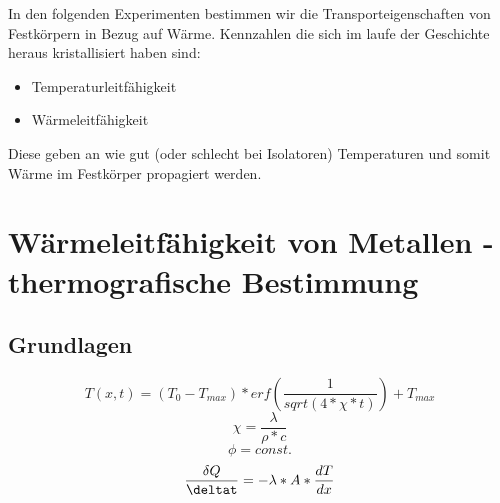\documentclass[12pt,a4paper]{article}
\begin{document}
\begin{multicols}{2}




%			


\noindent In den folgenden Experimenten bestimmen wir die Transporteigenschaften von Festkörpern in Bezug auf Wärme. Kennzahlen die sich im laufe der Geschichte heraus kristallisiert haben sind:\\
\begin{itemize}
	\item Temperaturleitfähigkeit
	\item Wärmeleitfähigkeit
\end{itemize}
Diese geben an wie gut (oder schlecht bei Isolatoren) Temperaturen und somit Wärme im Festkörper propagiert werden.

\section{Wärmeleitfähigkeit von Metallen - thermografische Bestimmung}

\subsection{Grundlagen}
$$T(x,t) = (T_0 - T_{max}) * erf(\frac{1}{sqrt(4 * \chi * t)})+T_{max}$$
$$\chi = \frac{\lambda}{\rho*c}$$
$$\phi = const.$$
$$\frac{\delta Q}{\deltat} = -\lambda * A * \frac{dT}{dx}$$

\end{multicols}
\end{document}
